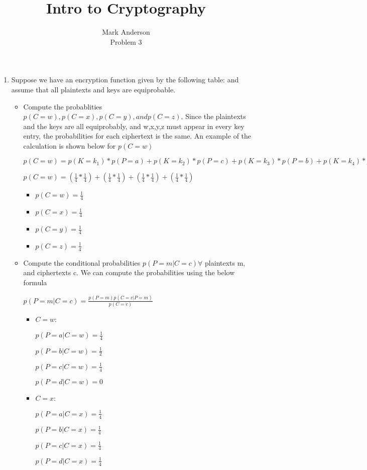 \documentclass[12pt]{article}
\begin{document}
 
\title{Intro to Cryptography} 
\author{Mark Anderson\\ 
Problem 3} 
 
\maketitle
\begin{enumerate}
  \item Suppose we have an encryption function given by the following table:
    and assume that all plaintexts and keys are equiprobable.

    \begin{itemize}
      \item Compute the probablities $p(C=w), p(C=x), p(C=y), and p(C=z)$.
        Since the plaintexts and the keys are all equiprobably, and w,x,y,z must appear in every key entry, the probabilities for each ciphertext is the same.  An example of the calculation is shown below for $p(C=w)$\par
        $p(C=w) = p(K=k_1)*p(P=a) + p(K=k_2)*p(P=c) + p(K=k_3)*p(P=b) + p(K=k_4)*p(P=b)$\par
        $p(C=w) = (\frac{1}{4} * \frac{1}{4}) + (\frac{1}{4} * \frac{1}{4}) + (\frac{1}{4} * \frac{1}{4}) + (\frac{1}{4} * \frac{1}{4})$
        \begin{itemize}
          \item $p(C=w) = \frac{1}{4}$
          \item $p(C=x) = \frac{1}{4}$
          \item $p(C=y) = \frac{1}{4}$
          \item $p(C=z) = \frac{1}{4}$
        \end{itemize}

      \item Compute the conditional probabilities $p(P=m|C=c) \forall $ plaintexts m, and ciphertexts c.
        We can compute the probabilities using the below formula\par
        $p(P=m|C=c) = \frac{p(P=m)p(C=c|P=m)}{p(C=c)}$

        \begin{itemize}
          \item $C=w$: \par$p(P=a|C=w)=\frac{1}{4}$\par$p(P=b|C=w)=\frac{1}{2}$\par$p(P=c|C=w)=\frac{1}{4}$\par$p(P=d|C=w)=0$ 
          \item $C=x$: \par$p(P=a|C=x)=\frac{1}{4}$\par$p(P=b|C=x)=\frac{1}{4}$\par$p(P=c|C=x)=\frac{1}{4}$\par$p(P=d|C=x)=\frac{1}{4}$ 


\end{itemize}
\end{itemize}
\end{enumerate}
\end{document}
